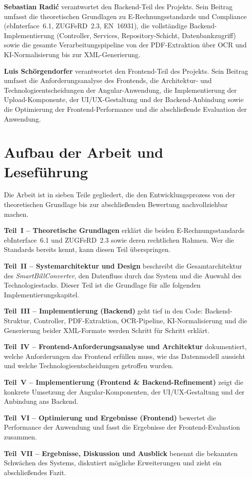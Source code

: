 \textbf{Sebastian Radić} verantwortet den Backend-Teil des Projekts.
Sein Beitrag umfasst die theoretischen Grundlagen zu E-Rechnungsstandards und Compliance
(ebInterface~6.1, ZUGFeRD~2.3, EN~16931), die vollständige Backend-Implementierung
(Controller, Services, Repository-Schicht, Datenbankzugriff) sowie die gesamte
Verarbeitungspipeline von der PDF-Extraktion über OCR und KI-Normalisierung
bis zur XML-Generierung.

\textbf{Luis Schörgendorfer} verantwortet den Frontend-Teil des Projekts.
Sein Beitrag umfasst die Anforderungsanalyse des Frontends, die Architektur- und
Technologieentscheidungen der Angular-Anwendung, die Implementierung der Upload-Komponente,
der UI/UX-Gestaltung und der Backend-Anbindung sowie die Optimierung der
Frontend-Performance und die abschließende Evaluation der Anwendung.

\section{Aufbau der Arbeit und Leseführung}
Die Arbeit ist in sieben Teile gegliedert, die den Entwicklungsprozess von der
theoretischen Grundlage bis zur abschließenden Bewertung nachvollziehbar machen.

\textbf{Teil~I -- Theoretische Grundlagen} erklärt die beiden E-Rechnungsstandards
ebInterface~6.1 und ZUGFeRD~2.3 sowie deren rechtlichen Rahmen.
Wer die Standards bereits kennt, kann diesen Teil überspringen.

\textbf{Teil~II -- Systemarchitektur und Design} beschreibt die Gesamtarchitektur
des \textit{SmartBillConverter}, den Datenfluss durch das System und die Auswahl
des Technologiestacks. Dieser Teil ist die Grundlage für alle folgenden
Implementierungskapitel.

\textbf{Teil~III -- Implementierung (Backend)} geht tief in den Code:
Backend-Struktur, Controller, PDF-Extraktion, OCR-Pipeline, KI-Normalisierung
und die Generierung beider XML-Formate werden Schritt für Schritt erklärt.

\textbf{Teil~IV -- Frontend-Anforderungsanalyse und Architektur} dokumentiert,
welche Anforderungen das Frontend erfüllen muss, wie das Datenmodell aussieht
und welche Technologieentscheidungen getroffen wurden.

\textbf{Teil~V -- Implementierung (Frontend \& Backend-Refinement)} zeigt die
konkrete Umsetzung der Angular-Komponenten, der UI/UX-Gestaltung und der
Anbindung ans Backend.

\textbf{Teil~VI -- Optimierung und Ergebnisse (Frontend)} bewertet die Performance
der Anwendung und fasst die Ergebnisse der Frontend-Evaluation zusammen.

\textbf{Teil~VII -- Ergebnisse, Diskussion und Ausblick} benennt die bekannten
Schwächen des Systems, diskutiert mögliche Erweiterungen und zieht ein
abschließendes Fazit.